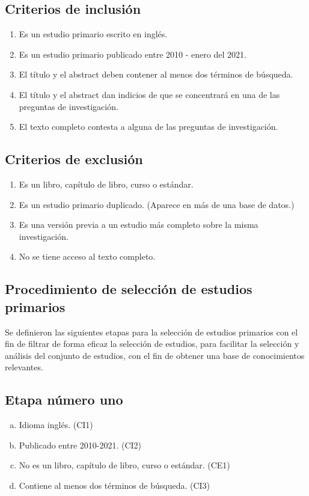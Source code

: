 \documentclass{article}
\begin{document}
\subsection{Criterios de inclusión}
\begin{enumerate}[C-1.-]
  \item{Es un estudio primario escrito en inglés.}
  \item{Es un estudio primario publicado entre 2010 - enero del 2021.}
  \item{El título y el abstract deben contener al menos dos términos de búsqueda.}
  \item{El título y el abstract dan indicios de que se concentrará en una de las preguntas de investigación.}
  \item{El texto completo contesta a alguna de las preguntas de investigación.}
\end{enumerate}

\subsection{Criterios de exclusión}
\begin{enumerate}[CE-1.-]
  \item{Es un libro, capítulo de libro, curso o estándar.}
  \item{Es un estudio primario duplicado. (Aparece en más de una base de datos.)}
  \item{Es una versión previa a un estudio más completo sobre la misma investigación.}
  \item{No se tiene acceso al texto completo.}
\end{enumerate}
\newpage

\subsection{Procedimiento de selección de estudios primarios}
Se definieron las siguientes etapas para la selección de estudios primarios con el fin 
de filtrar de forma eficaz la selección de estudios, para facilitar la selección y análisis 
del conjunto de estudios, con el fin de obtener una base de conocimientos relevantes. 

\subsection{Etapa número uno}
\begin{enumerate}[(a)]
  \item{Idioma inglés. (CI1)}
  \item{Publicado entre 2010-2021. (CI2)}
  \item{No es un libro, capítulo de libro, curso o estándar. (CE1)}
  \item{Contiene al menos dos términos de búsqueda. (CI3)}
\end{enumerate}
\end{document}
